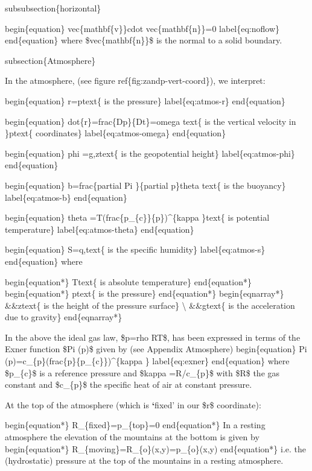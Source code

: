 \documentclass[letterpaper,10pt,english]{sphinxmanual}
\begin{document}
subsubsection\{horizontal\}

begin\{equation\}
vec\{mathbf\{v\}\}cdot vec\{mathbf\{n\}\}=0  label\{eq:noflow\}
end\{equation\}
where \$vec\{mathbf\{n\}\}\$ is the normal to a solid boundary.

subsection\{Atmosphere\}

In the atmosphere, (see figure ref\{fig:zandp-vert-coord\}), we interpret:

begin\{equation\}
r=ptext\{ is the pressure\}  label\{eq:atmos-r\}
end\{equation\}

begin\{equation\}
dot\{r\}=frac\{Dp\}\{Dt\}=omega text\{ is the vertical velocity in \}ptext\{
coordinates\}  label\{eq:atmos-omega\}
end\{equation\}

begin\{equation\}
phi =g,ztext\{ is the geopotential height\}  label\{eq:atmos-phi\}
end\{equation\}

begin\{equation\}
b=frac\{partial Pi \}\{partial p\}theta text\{ is the buoyancy\}
label\{eq:atmos-b\}
end\{equation\}

begin\{equation\}
theta =T(frac\{p\_\{c\}\}\{p\})\textasciicircum{}\{kappa \}text\{ is potential temperature\}
label\{eq:atmos-theta\}
end\{equation\}

begin\{equation\}
S=q,text\{ is the specific humidity\}  label\{eq:atmos-s\}
end\{equation\}
where

begin\{equation*\}
Ttext\{ is absolute temperature\}
end\{equation*\}
begin\{equation*\}
ptext\{ is the pressure\}
end\{equation*\}
begin\{eqnarray*\}
\&\&ztext\{ is the height of the pressure surface\} \textbackslash{}
\&\&gtext\{ is the acceleration due to gravity\}
end\{eqnarray*\}

In the above the ideal gas law, \$p=rho RT\$, has been expressed in terms of
the Exner function \$Pi (p)\$ given by (see Appendix Atmosphere)
begin\{equation\}
Pi (p)=c\_\{p\}(frac\{p\}\{p\_\{c\}\})\textasciicircum{}\{kappa \}  label\{eq:exner\}
end\{equation\}
where \$p\_\{c\}\$ is a reference pressure and \$kappa =R/c\_\{p\}\$ with \$R\$ the gas
constant and \$c\_\{p\}\$ the specific heat of air at constant pressure.

At the top of the atmosphere (which is {\color{red}\bfseries{}{}`}fixed' in our \$r\$ coordinate):

begin\{equation*\}
R\_\{fixed\}=p\_\{top\}=0
end\{equation*\}
In a resting atmosphere the elevation of the mountains at the bottom is
given by
begin\{equation*\}
R\_\{moving\}=R\_\{o\}(x,y)=p\_\{o\}(x,y)
end\{equation*\}
i.e. the (hydrostatic) pressure at the top of the mountains in a resting
atmosphere.
\end{document}
